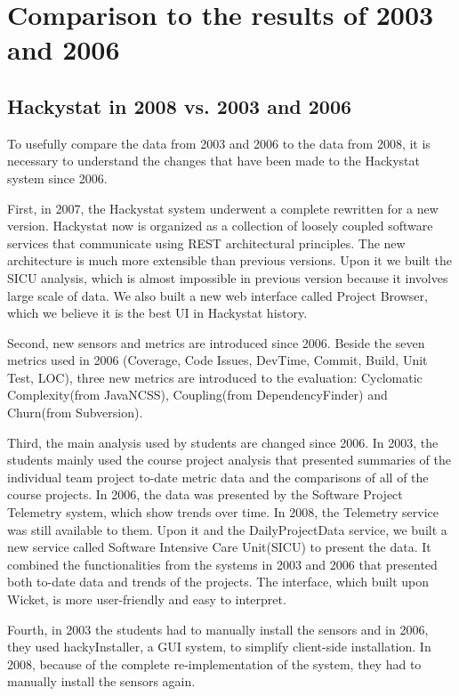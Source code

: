 \documentclass[11pt]{article}
\begin{document}
\section{Comparison to the results of 2003 and 2006}
\subsection{Hackystat in 2008 vs. 2003 and 2006}
To usefully compare the data from 2003 and 2006 to the data from 2008, it is necessary to understand the changes that have been made to the Hackystat system since 2006.

First, in 2007, the Hackystat system underwent a complete rewritten for a new version. Hackystat now is organized as a collection of loosely coupled software services that communicate using REST architectural principles. The new architecture is much more extensible than previous versions. Upon it we built the SICU analysis, which is almost impossible in previous version because it involves large scale of data. We also built a new web interface called Project Browser, which we believe it is the best UI in Hackystat history.

Second, new sensors and metrics are introduced since 2006. Beside the seven metrics used in 2006 (Coverage, Code Issues, DevTime, Commit, Build, Unit Test, LOC), three new metrics are introduced to the evaluation: Cyclomatic Complexity(from JavaNCSS), Coupling(from DependencyFinder) and Churn(from Subversion).

Third, the main analysis used by students are changed since 2006. In 2003, the students mainly used the course project analysis that presented summaries of the individual team project to-date metric data and the comparisons of all of the course projects. In 2006, the data was presented by the Software Project Telemetry system, which show trends over time. In 2008, the Telemetry service was still available to them. Upon it and the DailyProjectData service, we built a new service called Software Intensive Care Unit(SICU) to present the data. It combined the functionalities from the systems in 2003 and 2006 that presented both to-date data and trends of the projects. The interface, which built upon Wicket, is more user-friendly and easy to interpret.

Fourth, in 2003 the students had to manually install the sensors and in 2006, they used hackyInstaller, a GUI system, to simplify client-side installation. In 2008, because of the complete re-implementation of the system, they had to manually install the sensors again.
\end{document}
